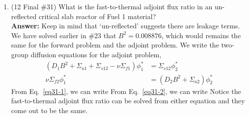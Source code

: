 \documentclass{school-22.211-notes}
\begin{document}
\begin{enumerate}
\item (12 Final \#31) What is the fast-to-thermal adjoint flux ratio in an un-reflected critical slab reactor of Fuel 1 material? \\
\textbf{Answer:} Keep in mind that `un-reflected' suggests there are leakage terms. We have solved earlier in \#23 that $B^2 = 0.008876$, which would remains the same for the forward problem and the adjoint problem. We write the two-group diffusion equations for the adjoint problem, 
\begin{align}
(D_1 B^2 + \Sigma_{a1} + \Sigma_{s12} - \nu \Sigma_{f1}) \phi_1^* &= \Sigma_{s12} \phi_2^* \label{eq31-1}\\
\nu \Sigma_{f2}\phi_1^* &=  (D_2 B^2 + \Sigma_{a2}) \phi_2^*  \label{eq31-2}
\end{align}
From Eq.~\ref{eq31-1}, we can write
From Eq.~\ref{eq31-2}, we can write
Notice the fast-to-thermal adjoint flux ratio can be solved from either equation and they come out to be the same. 

\end{enumerate}
\clearpage
\end{document}
